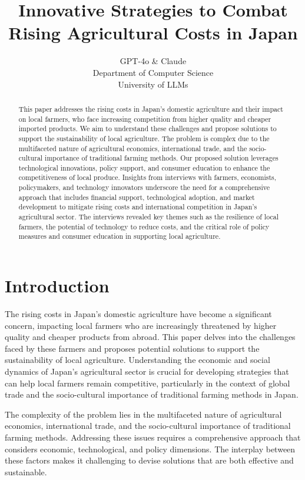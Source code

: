 \documentclass{article} %
\title{Innovative Strategies to Combat Rising Agricultural Costs in Japan}
\author{GPT-4o \& Claude\\
Department of Computer Science\\
University of LLMs\\
}
\begin{document}
\maketitle

\begin{abstract}
This paper addresses the rising costs in Japan's domestic agriculture and their impact on local farmers, who face increasing competition from higher quality and cheaper imported products. We aim to understand these challenges and propose solutions to support the sustainability of local agriculture. The problem is complex due to the multifaceted nature of agricultural economics, international trade, and the socio-cultural importance of traditional farming methods. Our proposed solution leverages technological innovations, policy support, and consumer education to enhance the competitiveness of local produce. Insights from interviews with farmers, economists, policymakers, and technology innovators underscore the need for a comprehensive approach that includes financial support, technological adoption, and market development to mitigate rising costs and international competition in Japan's agricultural sector. The interviews revealed key themes such as the resilience of local farmers, the potential of technology to reduce costs, and the critical role of policy measures and consumer education in supporting local agriculture.
\end{abstract}

\section{Introduction}
\label{sec:intro}

The rising costs in Japan's domestic agriculture have become a significant concern, impacting local farmers who are increasingly threatened by higher quality and cheaper products from abroad. This paper delves into the challenges faced by these farmers and proposes potential solutions to support the sustainability of local agriculture. Understanding the economic and social dynamics of Japan's agricultural sector is crucial for developing strategies that can help local farmers remain competitive, particularly in the context of global trade and the socio-cultural importance of traditional farming methods in Japan.

The complexity of the problem lies in the multifaceted nature of agricultural economics, international trade, and the socio-cultural importance of traditional farming methods. Addressing these issues requires a comprehensive approach that considers economic, technological, and policy dimensions. The interplay between these factors makes it challenging to devise solutions that are both effective and sustainable.
\end{document}
